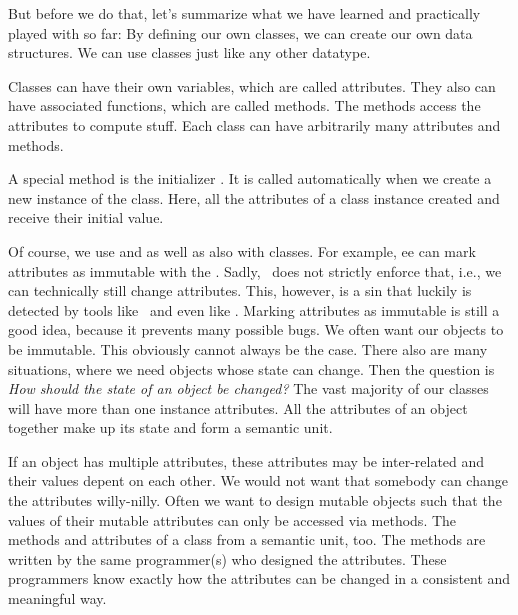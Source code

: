 But before we do that, let's summarize what we have learned and practically played with so far:
By defining our own classes, we can create our own data structures.
We can use classes just like any other datatype.

Classes can have their own variables, which are called attributes.
They also can have associated functions, which are called methods.
The methods access the attributes to compute stuff.
Each class can have arbitrarily many attributes and methods.

A special method is the initializer .
It is called automatically when we create a new instance of the class.
Here, all the attributes of a class instance created and receive their initial value.

Of course, we use  and  as well as  also with classes.
For example, ee can mark attributes as immutable with the  .
Sadly, \python\ does not strictly enforce that, i.e., we can technically still change  attributes.
This, however, is a sin that luckily is detected by tools like \mypy\ and even  like \pycharm.
Marking attributes as immutable is still a good idea, because it prevents many possible bugs.%
\FloatBarrier%
\endhsection%
%
%
\FloatBarrier%
%
%
%
%
We often want our objects to be immutable.
This obviously cannot always be the case.
There also are many situations, where we need objects whose state can change.
Then the question is \emph{How should the state of an object be changed?}
The vast majority of our classes will have more than one instance attributes.
All the attributes of an object together make up its state and form a semantic unit.

If an object has multiple attributes, these attributes may be inter-related and their values depent on each other.
We would not want that somebody can change the attributes willy-nilly.
Often we want to design mutable objects such that the values of their mutable attributes can only be accessed via methods.
The methods and attributes of a class from a semantic unit, too.
The methods are written by the same programmer(s) who designed the attributes.
These programmers know exactly how the attributes can be changed in a consistent and meaningful way.

